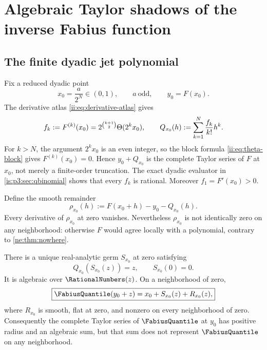 \section{Algebraic Taylor shadows of the inverse Fabius function}
\label{is:p2:sec:inverse-germs}

\subsection{The finite dyadic jet polynomial}

Fix a reduced dyadic point
\begin{equation}
 x_0=\frac{a}{2^N}\in(0,1),
 \qquad a\ \text{odd},
 \qquad y_0=F(x_0).
 \label{is:p2:eq:x0-y0}
\end{equation}
The derivative atlas \eqref{ii:eq:derivative-atlas} gives
\begin{equation}
 f_k:=F^{(k)}(x_0)
 =2^{\binom{k+1}{2}}\Theta(2^kx_0),
 \qquad
 Q_{x_0}(h):=\sum_{k=1}^{N}\frac{f_k}{k!}h^k.
 \label{is:p2:eq:Q-dyadic}
\end{equation}
For $k>N$, the argument $2^kx_0$ is an even integer, so the block formula
\eqref{ii:eq:theta-block} gives $F^{(k)}(x_0)=0$.  Hence $y_0+Q_{x_0}$
is the complete Taylor series of $F$ at $x_0$, not merely a finite-order
truncation.  The exact dyadic evaluator in \cref{is:p3:sec:qbinomial} shows
that every $f_k$ is rational.  Moreover $f_1=F'(x_0)>0$.

Define the smooth remainder
\begin{equation}
 \rho_{x_0}(h):=F(x_0+h)-y_0-Q_{x_0}(h).
 \label{is:p2:eq:rho-flat}
\end{equation}
Every derivative of $\rho_{x_0}$ at zero vanishes.  Nevertheless
$\rho_{x_0}$ is not identically zero on any neighborhood: otherwise $F$
would agree locally with a polynomial, contrary to \cref{ne:thm:nowhere}.

\begin{theorem}
\label{is:p2:thm:algebraic-inverse-germ}
There is a unique real-analytic germ $S_{x_0}$ at zero satisfying
\begin{equation}
 Q_{x_0}(S_{x_0}(z))=z,
 \qquad S_{x_0}(0)=0.
 \label{is:p2:eq:S-inverse}
\end{equation}
It is algebraic over $\RationalNumbers(z)$.  On a neighborhood of zero,
\begin{equation}
 \boxed{
 \FabiusQuantile(y_0+z)
 =x_0+S_{x_0}(z)+R_{x_0}(z),}
 \label{is:p2:eq:G-shadow}
\end{equation}
where $R_{x_0}$ is smooth, flat at zero, and nonzero on every neighborhood
of zero.  Consequently the complete Taylor series of $\FabiusQuantile$ at
$y_0$ has positive radius and an algebraic sum, but that sum does not
represent $\FabiusQuantile$ on any neighborhood.
\end{theorem}

